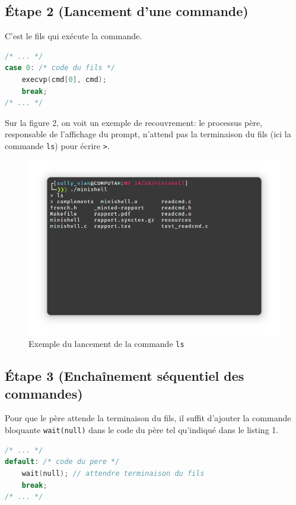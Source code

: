 \documentclass{article}
\begin{document}
\subsection*{Étape 2 (Lancement d'une commande)}

C'est le fils qui exécute la commande.

\begin{lstlisting}[language=C, caption=Code de la question 2]
/* ... */
case 0: /* code du fils */
    execvp(cmd[0], cmd);
    break;
/* ... */
\end{lstlisting}

Sur la figure 2, on voit un exemple de recouvrement: le processus père, responsable de l'affichage du prompt, n'attend pas la terminaison du fils (ici la commande \texttt{ls}) pour écrire \texttt{>}.

\begin{figure}[H]
    \centering
    \includegraphics[width=1\textwidth]{./resources/E2.png}
    \caption{Exemple du lancement de la commande \texttt{ls}}
    \label{fig:E2}
\end{figure}

\subsection*{Étape 3 (Enchaînement séquentiel des commandes)}

Pour que le père attende la terminaison du fils, il suffit d'ajouter la commande bloquante \texttt{wait(null)} dans le code du père tel qu'indiqué dans le listing 1.

\begin{lstlisting}[language=C, caption=Ajout pour la question 3]
/* ... */
default: /* code du pere */
    wait(null); // attendre terminaison du fils
    break;
/* ... */
\end{lstlisting}
\end{document}
